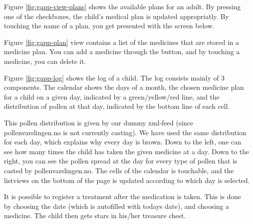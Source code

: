 Figure \ref{fig:gapp-view-plans} shows the available plans for an adult. By pressing one of the checkboxes, the child's medical plan
is updated appropriatly. By touching the name of a plan, you get presented with the screen below. 

Figure \ref{fig:gapp-plan} view contains a list of the medicines that are stored in a medicine plan. You can add a medicine through the button, 
and by touching a medicine, you can delete it. 
  

Figure \ref{fig:gapp-log} shows the log of a child.
The log consists mainly of 3 components. The calendar shows the days of a month, the chosen medicine plan for a child on a
given day, indicated by a green/yellow/red line, and the distribution of pollen at that day, indicated by the bottom line of each cell. 


This pollen distribution is given by our dummy xml-feed (since pollenvarslingen.no is not currently casting). 
We have used the same distribution for each day, which explains why every day is brown. Down to the left, one can see how many
times the child has taken the given medicine at a day. Down to the right, you can see the pollen spread at the day for every type 
of pollen that is casted by pollenvarslingen.no. 
The cells of the calendar is touchable, and the listviews on the bottom of the page is updated according to which day is selected.


It is possible to register a treatment after the medication is taken. This is done by choosing the date (which is autofilled with todays date),
and choosing a medicine. The child then gets stars in his/her treasure chest. 

